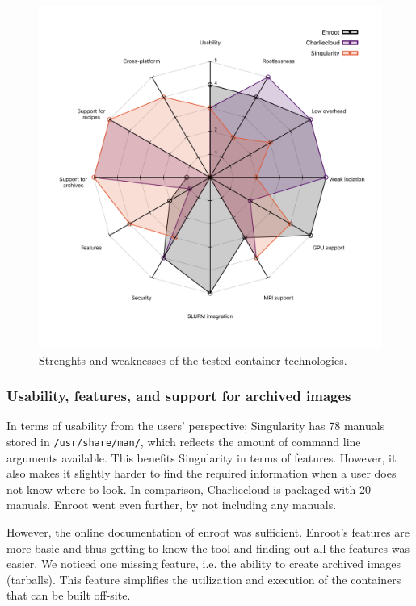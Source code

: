 \documentclass[12pt]{article}
\begin{document}
    \begin{figure}[H]
    \centering
    \includegraphics[scale=0.35]{images/containers_spider.pdf}
    \caption{Strenghts and weaknesses of the tested container technologies.}
    \label{fig:container_tech}
    \end{figure}

    \subsubsection{Usability, features, and support for archived images}
    In terms of usability from the users' perspective; Singularity has 78 manuals stored in \linebreak \texttt{/usr/share/man/}, which reflects the amount of command line arguments available. This benefits Singularity in terms of features. However, it also makes it slightly harder to find the required information when a user does not know where to look. In comparison, Charliecloud is packaged with 20 manuals. Enroot went even further, by not including any manuals.
    
    However, the online documentation of enroot was sufficient. Enroot's features are more basic and thus getting to know the tool and finding out all the features was easier. We noticed one missing feature, i.e. the ability to create archived images (tarballs). This feature simplifies the utilization and execution of the containers that can be built off-site.
    
\end{document}
